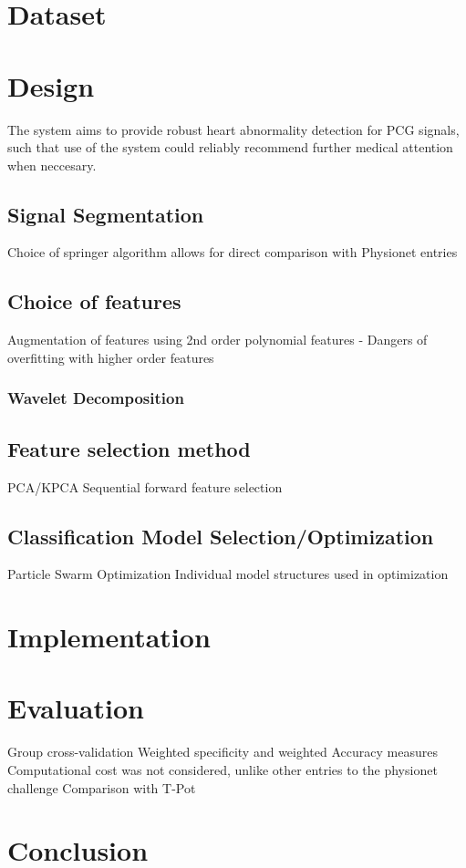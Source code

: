 \documentclass[titlepage, 12pt]{scrartcl} \usepackage{enumitem}
\begin{document}

\section{Dataset}\label{Dataset}

\section{Design}
The system aims to provide robust heart abnormality detection for PCG signals,
such that use of the system could reliably recommend further medical attention
when neccesary.
\subsection{Signal Segmentation}
Choice of springer algorithm allows for direct comparison with Physionet
entries
\subsection{Choice of features}

Augmentation of features using 2nd order polynomial features
- Dangers of overfitting with higher order features
\subsubsection{Wavelet Decomposition}
\subsection{Feature selection method}
PCA/KPCA
Sequential forward feature selection
\subsection{Classification Model Selection/Optimization}
Particle Swarm Optimization
Individual model structures used in optimization

\section{Implementation}
\section{Evaluation}
Group cross-validation
Weighted specificity and weighted Accuracy measures
Computational cost was not considered, unlike other entries to the physionet
challenge
Comparison with T-Pot
\section{Conclusion}



\pagebreak{}
\printbibliography{}
\end{document}

